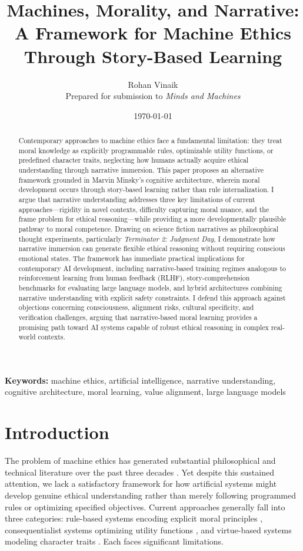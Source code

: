 \documentclass[12pt]{article}
\title{Machines, Morality, and Narrative: A Framework for Machine Ethics Through Story-Based Learning}
\author{Rohan Vinaik\\
\small Prepared for submission to \textit{Minds and Machines}}
\date{\today}
\begin{document}
\maketitle

\begin{abstract}
Contemporary approaches to machine ethics face a fundamental limitation: they treat moral knowledge as explicitly programmable rules, optimizable utility functions, or predefined character traits, neglecting how humans actually acquire ethical understanding through narrative immersion. This paper proposes an alternative framework grounded in Marvin Minsky's cognitive architecture, wherein moral development occurs through story-based learning rather than rule internalization. I argue that narrative understanding addresses three key limitations of current approaches---rigidity in novel contexts, difficulty capturing moral nuance, and the frame problem for ethical reasoning---while providing a more developmentally plausible pathway to moral competence. Drawing on science fiction narratives as philosophical thought experiments, particularly \textit{Terminator 2: Judgment Day}, I demonstrate how narrative immersion can generate flexible ethical reasoning without requiring conscious emotional states. The framework has immediate practical implications for contemporary AI development, including narrative-based training regimes analogous to reinforcement learning from human feedback (RLHF), story-comprehension benchmarks for evaluating large language models, and hybrid architectures combining narrative understanding with explicit safety constraints. I defend this approach against objections concerning consciousness, alignment risks, cultural specificity, and verification challenges, arguing that narrative-based moral learning provides a promising path toward AI systems capable of robust ethical reasoning in complex real-world contexts.
\end{abstract}

\noindent\textbf{Keywords:} machine ethics, artificial intelligence, narrative understanding, cognitive architecture, moral learning, value alignment, large language models

\section{Introduction}

The problem of machine ethics has generated substantial philosophical and technical literature over the past three decades \citep{wallach2008moral, anderson2011machine, allen2005artificial, moor2006nature}. Yet despite this sustained attention, we lack a satisfactory framework for how artificial systems might develop genuine ethical understanding rather than merely following programmed rules or optimizing specified objectives. Current approaches generally fall into three categories: rule-based systems encoding explicit moral principles \citep{gips1995towards, anderson2008geneth}, consequentialist systems optimizing utility functions \citep{abel2016reinforcement, russell2019human}, and virtue-based systems modeling character traits \citep{howard2001computational, vallor2016technology}. Each faces significant limitations.
\end{document}
